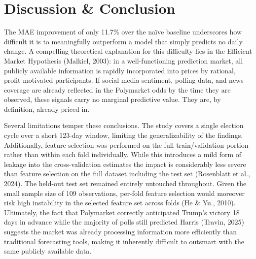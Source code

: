 \section{Discussion \& Conclusion}

The MAE improvement of only 11.7\% over the naïve baseline underscores how difficult it is to meaningfully outperform a model that simply predicts no daily change. A compelling theoretical explanation for this difficulty lies in the Efficient Market Hypothesis (Malkiel, 2003): in a well-functioning prediction market, all publicly available information is rapidly incorporated into prices by rational, profit-motivated participants. If social media sentiment, polling data, and news coverage are already reflected in the Polymarket odds by the time they are observed, these signals carry no marginal predictive value. They are, by definition, already priced in.

Several limitations temper these conclusions. The study covers a single election cycle over a short 123-day window, limiting the generalizability of the findings. Additionally, feature selection was performed on the full train/validation portion rather than within each fold individually. While this introduces a mild form of leakage into the cross-validation estimates the impact is considerably less severe than feature selection on the full dataset including the test set (Rosenblatt et al., 2024). The held-out test set remained entirely untouched throughout. Given the small sample size of 109 observations, per-fold feature selection would moreover risk high instability in the selected feature set across folds (He \& Yu., 2010). Ultimately, the fact that Polymarket correctly anticipated Trump's victory 18 days in advance while the majority of polls still predicted Harris (Travin, 2025) suggests the market was already processing information more efficiently than traditional forecasting tools, making it inherently difficult to outsmart with the same publicly available data.
